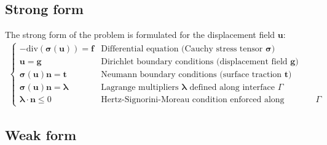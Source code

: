 \documentclass[11pt, a4paper]{article}
\begin{document}
\subsection{Strong form}
\label{subsec:strong}

The strong form of the problem is formulated for the displacement field $\mathbf{u}$:
\begin{align}
    \begin{cases}
        - \text{div}(\boldsymbol{\sigma}(\mathbf{u})) = \mathbf{f} &\text{Differential equation (Cauchy stress tensor $\boldsymbol{\sigma}$)}\\
        \mathbf{u} = \mathbf{g} &\text{Dirichlet boundary conditions (displacement field $\mathbf{g}$)}\\
        \boldsymbol{\sigma}(\mathbf{u}) \mathbf{n} = \mathbf{t} &\text{Neumann boundary conditions (surface traction $\mathbf{t}$)}\\
        \boldsymbol{\sigma}(\mathbf{u}) \mathbf{n} = \boldsymbol{\lambda} &\text{Lagrange multipliers $\boldsymbol{\lambda}$ defined along interface $\Gamma$}\\
        \boldsymbol{\lambda} \cdot \mathbf{n} \leq 0 &\text{Hertz-Signorini-Moreau condition enforced along interface $\Gamma$}
    \end{cases}
\end{align}

\subsection{Weak form}
\label{subsec:weak}
\end{document}
